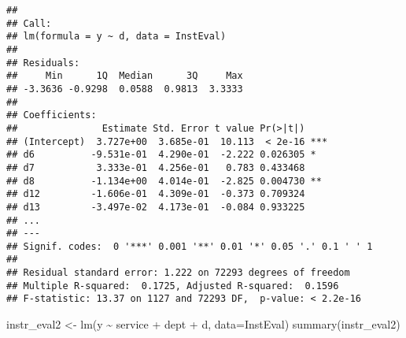 \documentclass[
]{article}
\newenvironment{Shaded}{\begin{snugshade}}{\end{snugshade}}
\newcommand{\AttributeTok}[1]{\textcolor[rgb]{0.77,0.63,0.00}{#1}}
\newcommand{\FunctionTok}[1]{\textcolor[rgb]{0.00,0.00,0.00}{#1}}
\newcommand{\NormalTok}[1]{#1}
\newcommand{\OtherTok}[1]{\textcolor[rgb]{0.56,0.35,0.01}{#1}}
\newcommand{\SpecialCharTok}[1]{\textcolor[rgb]{0.00,0.00,0.00}{#1}}
\begin{document}
\begin{verbatim}
## 
## Call:
## lm(formula = y ~ d, data = InstEval)
## 
## Residuals:
##     Min      1Q  Median      3Q     Max 
## -3.3636 -0.9298  0.0588  0.9813  3.3333 
## 
## Coefficients:
##               Estimate Std. Error t value Pr(>|t|)    
## (Intercept)  3.727e+00  3.685e-01  10.113  < 2e-16 ***
## d6          -9.531e-01  4.290e-01  -2.222 0.026305 *  
## d7           3.333e-01  4.256e-01   0.783 0.433468    
## d8          -1.134e+00  4.014e-01  -2.825 0.004730 ** 
## d12         -1.606e-01  4.309e-01  -0.373 0.709324    
## d13         -3.497e-02  4.173e-01  -0.084 0.933225    
## ...
## ---
## Signif. codes:  0 '***' 0.001 '**' 0.01 '*' 0.05 '.' 0.1 ' ' 1
## 
## Residual standard error: 1.222 on 72293 degrees of freedom
## Multiple R-squared:  0.1725, Adjusted R-squared:  0.1596 
## F-statistic: 13.37 on 1127 and 72293 DF,  p-value: < 2.2e-16
\end{verbatim}

\begin{Shaded}
\begin{Highlighting}[]
\NormalTok{instr\_eval2 }\OtherTok{\textless{}{-}} \FunctionTok{lm}\NormalTok{(y }\SpecialCharTok{\textasciitilde{}}\NormalTok{ service }\SpecialCharTok{+}\NormalTok{ dept }\SpecialCharTok{+}\NormalTok{ d, }\AttributeTok{data=}\NormalTok{InstEval)}
\FunctionTok{summary}\NormalTok{(instr\_eval2)}
\end{Highlighting}
\end{Shaded}
\end{document}
